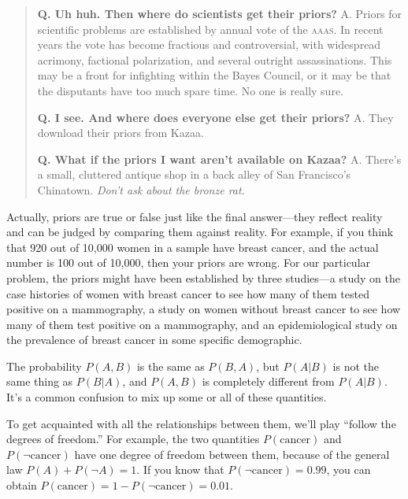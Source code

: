 {\begin{quote}
 \textbf{Q. Uh huh. Then where do scientists get their
priors?}\newline
 A. Priors for scientific problems are established by annual vote of the
\textsc{aaas}. In recent years the vote has become fractious and controversial,
with widespread acrimony, factional polarization, and several outright
assassinations. This may be a front for infighting within the Bayes
Council, or it may be that the disputants have too much spare time. No
one is really sure.


 \textbf{Q. I see. And where does everyone else get their
priors?}\newline
 A. They download their priors from Kazaa.

{
 \textbf{Q. What if the priors I want aren't
available on Kazaa?}\newline
 A. There's a small, cluttered antique shop in a back
alley of San Francisco's Chinatown.
\textit{Don't ask about the bronze rat.}}
\end{quote}



 Actually, priors are true or false just like the final
answer---they reflect reality and can be judged by comparing them
against reality. For example, if you think that 920 out of 10,000 women
in a sample have breast cancer, and the actual number is 100 out of
10,000, then your priors are wrong. For our particular problem, the
priors might have been established by three studies---a study on the
case histories of women with breast cancer to see how many of them
tested positive on a mammography, a study on women without breast
cancer to see how many of them test positive on a mammography, and an
epidemiological study on the prevalence of breast cancer in some
specific demographic.

\hr


 The probability $P(A,B)$ is the same as $P(B,A)$, but $P(A|B)$
is not the same thing as $P(B|A)$, and $P(A,B)$ is completely
different from $P(A|B)$. It's a common confusion
to mix up some or all of these quantities.


 To get acquainted with all the relationships between them,
we'll play ``follow the degrees of
freedom.'' For example, the two quantities $P(\text{cancer})$
and $P(\lnot\text{cancer})$ have one degree of freedom between them,
because of the general law $P(A) + P(\lnot A) = 1$. If you know that
$P(\lnot\text{cancer}) = 0.99$, you can obtain $P(\text{cancer}) = 1 -
P(\lnot\text{cancer}) = 0.01$.


}
